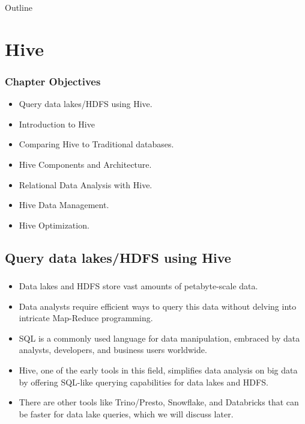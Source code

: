 \begin{frame}{Outline}
	\tableofcontents
\end{frame}
\section{Hive}



\begin{frame}
\frametitle{Chapter Objectives}

\begin{itemize}
	\item<1-> Query data lakes/HDFS using Hive. \pause
	\item<2-> Introduction to Hive \pause
	\item<3-> Comparing Hive to Traditional databases.
	\item<4-> Hive Components and Architecture. \pause
	\item<5-> Relational Data Analysis with Hive. \pause
	\item<6-> Hive Data Management. \pause
	\item<7-> Hive Optimization. \pause
\end{itemize}

\end{frame}

\subsection{Query data lakes/HDFS using Hive}
\begin{frame}
	\frametitle{\subsecname}
	\begin{itemize} 
		\item Data lakes and HDFS store vast amounts of petabyte-scale data.
		\item Data analysts require efficient ways to query this data without delving into intricate Map-Reduce programming.
		\item SQL is a commonly used language for data manipulation, embraced by data analysts, developers, and business users worldwide.
		\item Hive, one of the early tools in this field, simplifies data analysis on big data by offering SQL-like querying capabilities for data lakes and HDFS.
		\item There are other tools like Trino/Presto, Snowflake, and Databricks that can be faster for data lake queries, which we will discuss later.
	\end{itemize}
	\end{frame}

